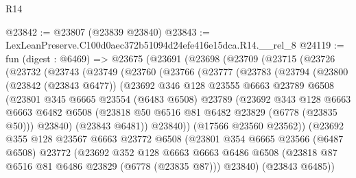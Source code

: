 \begin{lexlean}{R14}
\begin{coremodule}
@23842 := @23807 (@23839 @23840)
@23843 := LexLeanPreserve.C100d0aec372b51094d24efe416e15dca.R14.__rel_8
@24119 := fun (digest : @6469) =>
  @23675
    (@23691
      (@23698
        (@23709
          (@23715
            (@23726
              (@23732
                (@23743
                  (@23749
                    (@23760
                      (@23766
                        (@23777
                          (@23783
                            (@23794
                              (@23800
                                (@23842 (@23843 @6477))
                                (@23692
                                  @346
                                  @128
                                  @23555
                                  @6663
                                  @23789
                                  @6508
                                  (@23801
                                    @345
                                    @6665
                                    @23554
                                    (@6483 @6508)
                                    @23789
                                    (@23692
                                      @343
                                      @128
                                      @6663
                                      @6663
                                      @6482
                                      @6508
                                      (@23818 @50 @6516 @81 @6482 @23829 (@6778 (@23835 @50)))
                                      @23840)
                                    (@23843 @6481))
                                  @23840))
                              (@17566 @23560 @23562))
                            (@23692
                              @355
                              @128
                              @23567
                              @6663
                              @23772
                              @6508
                              (@23801
                                @354
                                @6665
                                @23566
                                (@6487 @6508)
                                @23772
                                (@23692
                                  @352
                                  @128
                                  @6663
                                  @6663
                                  @6486
                                  @6508
                                  (@23818 @87 @6516 @81 @6486 @23829 (@6778 (@23835 @87)))
                                  @23840)
                                (@23843 @6485))

\end{coremodule}
\end{lexlean}
